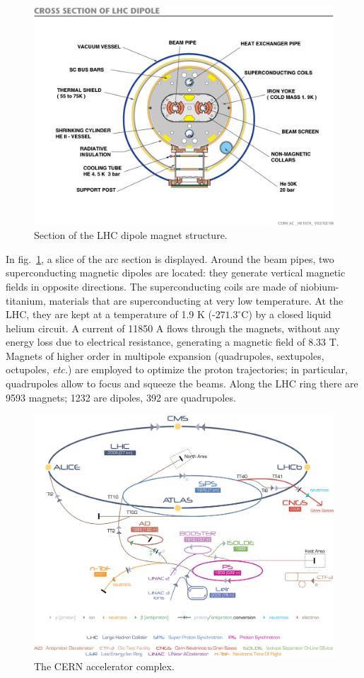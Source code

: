 \begin{figure}[!htb]
  \centering
    \includegraphics[width=.6\textwidth]{figures/LHC-magnets.jpg}
  \caption{Section of the LHC dipole magnet structure.}
  \label{fig:LHC_dipole}
\end{figure}

\noindent In fig.~\ref{fig:LHC_dipole}, a slice of the arc section is displayed. Around the beam pipes, two superconducting magnetic dipoles are located: they generate vertical magnetic fields in opposite directions. The superconducting coils are made of niobium-titanium, materials that are superconducting at very low temperature. At the LHC, they are kept at a temperature of 1.9 K (-$271.3^{\circ}$C) by a closed liquid helium circuit. A current of 11850 A flows through the magnets, without any energy loss due to electrical resistance, generating a magnetic field of 8.33 T. Magnets of higher order in multipole expansion (quadrupoles, sextupoles, octupoles, \textit{etc.}) are employed to optimize the proton trajectories; in particular, quadrupoles allow to focus and squeeze the beams. Along the LHC ring there are 9593 magnets; 1232 are dipoles, 392 are quadrupoles.

\begin{figure}[!htb]
  \centering
    \includegraphics[width=.75\textwidth]{figures/Cern-Accelerator-Complex.jpg}
  \caption{The CERN accelerator complex.}
  \label{fig:LHC_accelerator_complex}
\end{figure}

